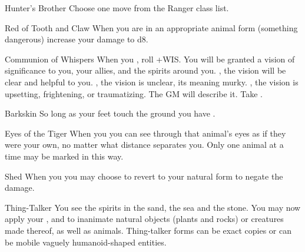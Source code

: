 \documentclass[8pt]{extarticle}
\begin{document}
\begin{multicols}{2}

\firstAdvances

\begin{amove}{Hunter’s Brother}
  Choose one move from the Ranger class list.
\end{amove}

\begin{amove}{Red of Tooth and Claw}
  When you are in an appropriate animal form (something dangerous)
  increase your damage to d8.
\end{amove}

\begin{amove}{Communion of Whispers}
  When you , roll
  +WIS. You will be granted a vision of significance to you, your
  allies, and the spirits around you. \onSuccess, the vision will be
  clear and helpful to you. \onPartial, the vision is unclear, its
  meaning murky. \onMiss, the vision is upsetting, frightening, or
  traumatizing. The GM will describe it. Take .
\end{amove}

\begin{amove}{Barkskin}
  So long as your feet touch the ground you have .
\end{amove}

\begin{amove}{Eyes of the Tiger}
  When you  you
  can see through that animal’s eyes as if they were your own, no
  matter what distance separates you. Only one animal at a time may be
  marked in this way.
\end{amove}

\begin{amove}{Shed}
  When you  you may choose
  to revert to your natural form to negate the damage.
\end{amove}

\begin{amove}{Thing-Talker}
  You see the spirits in the sand, the sea and the stone. You may now
  apply your ,  and
   to inanimate natural objects (plants and
  rocks) or creatures made thereof, as well as animals. Thing-talker
  forms can be exact copies or can be mobile vaguely humanoid-shaped
  entities.
\end{amove}


\end{multicols}
\end{document}
